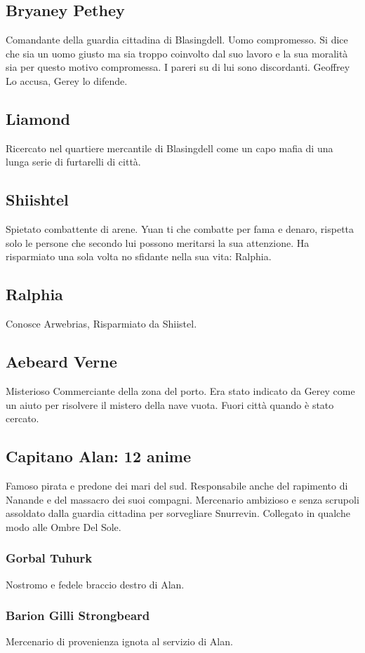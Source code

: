 \documentclass[10pt,twoside,twocolumn]{article}
\begin{document}
\subsection{Bryaney Pethey}
Comandante della guardia cittadina di Blasingdell. Uomo compromesso. Si dice che
sia un uomo giusto ma sia troppo coinvolto dal suo lavoro e la sua moralit\`a
sia per questo motivo compromessa. I pareri su di lui sono discordanti. Geoffrey
Lo accusa, Gerey lo difende.
\subsection{Liamond}
Ricercato nel quartiere mercantile di Blasingdell come un capo mafia di una
lunga serie di furtarelli di citt\`a.
\subsection{Shiishtel}
Spietato combattente di arene. Yuan ti che combatte per fama e denaro, rispetta
solo le persone che secondo lui possono meritarsi la sua attenzione. Ha risparmiato una
sola volta no sfidante nella sua vita: Ralphia.
\subsection{Ralphia}
Conosce Arwebrias, Risparmiato da Shiistel.
\subsection{Aebeard Verne}
Misterioso Commerciante della zona del porto. Era stato indicato da Gerey come un
aiuto per risolvere il mistero della nave vuota. Fuori citt\`a quando \`e stato cercato.
\subsection{Capitano Alan: 12 anime}
Famoso pirata e predone dei mari del sud. Responsabile anche del rapimento di Nanande e
del massacro dei suoi compagni. Mercenario ambizioso e senza scrupoli assoldato
dalla guardia cittadina per sorvegliare Snurrevin. Collegato in qualche modo alle
Ombre Del Sole.
\subsubsection{Gorbal Tuhurk}
Nostromo e fedele braccio destro di Alan. 
\subsubsection{Barion Gilli Strongbeard}
Mercenario di provenienza ignota al servizio di Alan.
\end{document}
